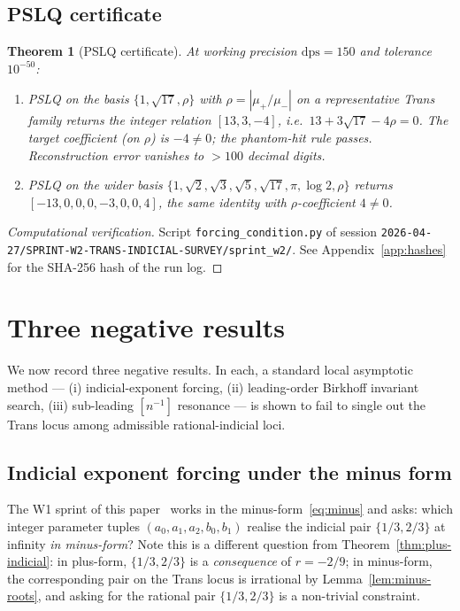 \documentclass[11pt]{amsart}
\newtheorem{theorem}{Theorem}[section]
\theoremstyle{definition}
\theoremstyle{remark}
\newcommand{\dps}{\mathrm{dps}}
\begin{document}
\subsection{PSLQ certificate}

\begin{theorem}[PSLQ certificate]\label{thm:pslq}
At working precision $\dps = 150$ and tolerance $10^{-50}$:
\begin{enumerate}[label={\upshape(\arabic*)}]
\item PSLQ on the basis
$\{1,\sqrt{17},\rho\}$ with $\rho = |\mu_+/\mu_-|$ on a
representative Trans family returns the integer relation
$[13,3,-4]$, i.e.\ $13 + 3\sqrt{17} - 4\rho = 0$.  The target
coefficient (on $\rho$) is $-4 \ne 0$; the phantom-hit rule
passes.  Reconstruction error vanishes to $> 100$ decimal digits.
\item PSLQ on the wider basis
$\{1,\sqrt{2},\sqrt{3},\sqrt{5},\sqrt{17},\pi,\log 2,\rho\}$
returns $[-13,0,0,0,-3,0,0,4]$, the same identity with
$\rho$-coefficient $4 \ne 0$.
\end{enumerate}
\end{theorem}
\begin{proof}[Computational verification]
Script \texttt{forcing\_condition.py} of session
\texttt{2026-04-27/SPRINT-W2-TRANS-INDICIAL-SURVEY/sprint\_w2/}.  See
Appendix~\ref{app:hashes} for the SHA-256 hash of the run log.
\end{proof}

\section{Three negative results}\label{sec:negative}

We now record three negative results.  In each, a standard local
asymptotic method --- (i) indicial-exponent forcing, (ii) leading-order
Birkhoff invariant search, (iii) sub-leading $[n^{-1}]$ resonance ---
is shown to fail to single out the Trans locus among admissible
rational-indicial loci.

\subsection{Indicial exponent forcing under the minus form}
\label{sec:indicial}

The W1 sprint of this paper~\cite{SprintW1Report} works in the
minus-form~\eqref{eq:minus} and asks: which integer parameter tuples
$(a_0,a_1,a_2,b_0,b_1)$ realise the indicial pair $\{1/3,2/3\}$ at
infinity \emph{in minus-form}?  Note this is a different question
from Theorem~\ref{thm:plus-indicial}: in plus-form, $\{1/3,2/3\}$ is
a \emph{consequence} of $r=-2/9$; in minus-form, the corresponding
pair on the Trans locus is irrational by Lemma~\ref{lem:minus-roots},
and asking for the rational pair $\{1/3,2/3\}$ is a non-trivial
constraint.
\end{document}
